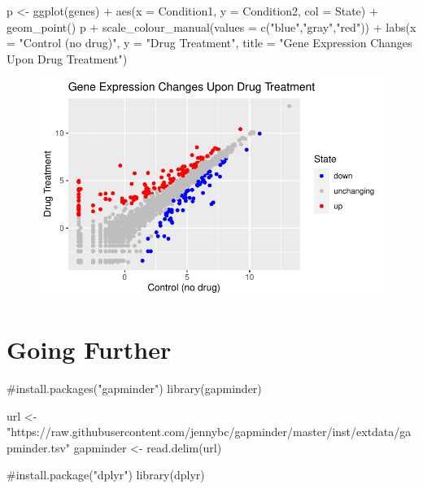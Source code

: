 \documentclass[
  letterpaper,
  DIV=11,
  numbers=noendperiod]{scrartcl}
\newenvironment{Shaded}{\begin{snugshade}}{\end{snugshade}}
\newcommand{\AttributeTok}[1]{\textcolor[rgb]{0.40,0.45,0.13}{#1}}
\newcommand{\CommentTok}[1]{\textcolor[rgb]{0.37,0.37,0.37}{#1}}
\newcommand{\FunctionTok}[1]{\textcolor[rgb]{0.28,0.35,0.67}{#1}}
\newcommand{\NormalTok}[1]{\textcolor[rgb]{0.00,0.23,0.31}{#1}}
\newcommand{\OtherTok}[1]{\textcolor[rgb]{0.00,0.23,0.31}{#1}}
\newcommand{\SpecialCharTok}[1]{\textcolor[rgb]{0.37,0.37,0.37}{#1}}
\newcommand{\StringTok}[1]{\textcolor[rgb]{0.13,0.47,0.30}{#1}}
\begin{document}
\begin{Shaded}
\begin{Highlighting}[]
\NormalTok{p }\OtherTok{\textless{}{-}} \FunctionTok{ggplot}\NormalTok{(genes) }\SpecialCharTok{+}
  \FunctionTok{aes}\NormalTok{(}\AttributeTok{x =}\NormalTok{ Condition1, }\AttributeTok{y =}\NormalTok{ Condition2, }\AttributeTok{col =}\NormalTok{ State) }\SpecialCharTok{+}
  \FunctionTok{geom\_point}\NormalTok{()}
\NormalTok{p }\SpecialCharTok{+} \FunctionTok{scale\_colour\_manual}\NormalTok{(}\AttributeTok{values =} \FunctionTok{c}\NormalTok{(}\StringTok{"blue"}\NormalTok{,}\StringTok{"gray"}\NormalTok{,}\StringTok{"red"}\NormalTok{)) }\SpecialCharTok{+}
  \FunctionTok{labs}\NormalTok{(}\AttributeTok{x =} \StringTok{"Control (no drug)"}\NormalTok{, }\AttributeTok{y =} \StringTok{"Drug Treatment"}\NormalTok{,}
       \AttributeTok{title =} \StringTok{"Gene Expression Changes Upon Drug Treatment"}\NormalTok{)}
\end{Highlighting}
\end{Shaded}

\begin{figure}[H]

{\centering \includegraphics{class05_files/figure-pdf/unnamed-chunk-3-2.pdf}

}

\end{figure}

\hypertarget{going-further}{%
\section{Going Further}\label{going-further}}

\begin{Shaded}
\begin{Highlighting}[]
\CommentTok{\#install.packages("gapminder")}
\FunctionTok{library}\NormalTok{(gapminder)}

\NormalTok{url }\OtherTok{\textless{}{-}} \StringTok{"https://raw.githubusercontent.com/jennybc/gapminder/master/inst/extdata/gapminder.tsv"}
\NormalTok{gapminder }\OtherTok{\textless{}{-}} \FunctionTok{read.delim}\NormalTok{(url)}

\CommentTok{\#install.package("dplyr")}
\FunctionTok{library}\NormalTok{(dplyr)}
\end{Highlighting}
\end{Shaded}
\end{document}
